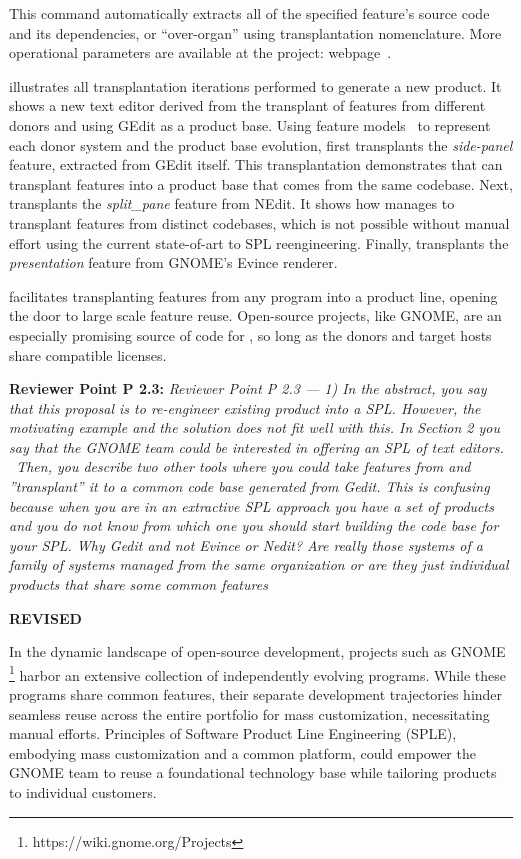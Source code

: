 This command automatically extracts all of the specified feature's source code and its dependencies, or “over-organ” using transplantation nomenclature. More operational parameters are available at the project: webpage~\cite{ProjectWebpage}.

 illustrates all transplantation iterations performed to generate a new product.  It shows a new text editor derived from the transplant of features from different donors and using GEdit as a product base. Using feature models~\cite{Kang1990} to represent each donor system and the product base evolution, \prodscalpel first transplants the \emph{side-panel} feature, extracted from GEdit itself. This transplantation demonstrates that \prodscalpel can transplant features into a product base that comes from the same codebase.  Next, \prodscalpel transplants the \emph{split\_pane} feature from NEdit. It shows how \prodscalpel manages to transplant features from distinct codebases, which is not possible without manual effort using the current state-of-art to SPL reengineering. Finally, \prodscalpel transplants the \emph{presentation} feature from GNOME's Evince renderer. 

\FOUNDRY facilitates transplanting features from any program into a product line, opening the door to large scale feature reuse. Open-source projects, like GNOME, are an especially promising source of code for \FOUNDRY, so long as the donors and target hosts share compatible licenses.

\textbf{Reviewer Point P 2.3:} \emph{Reviewer Point P 2.3 — 1) In the abstract, you say that this proposal is to re-engineer existing product into a SPL. However, the motivating example and the solution does not fit well with this. In Section 2 you say that the GNOME team could be interested in offering an SPL of text editors.  Then, you describe two other tools where you could take features from and ”transplant” it to a common code base generated from Gedit. This is confusing because when you are in an extractive SPL approach you have a set of products and you do not know from which one you should start building the code base for your SPL. Why Gedit and not Evince or Nedit? Are really those systems of a family of systems managed from the same organization or are they just individual products that share some common features}

\textbf{REVISED}

In the dynamic landscape of open-source development, projects such as GNOME \footnote{https://wiki.gnome.org/Projects} harbor an extensive collection of independently evolving programs. While these programs share common features, their separate development trajectories hinder seamless reuse across the entire portfolio for mass customization, necessitating manual efforts. Principles of Software Product Line Engineering (SPLE)\cite{Pohl2005}, embodying mass customization and a common platform, could empower the GNOME team to reuse a foundational technology base while tailoring products to individual customers.

